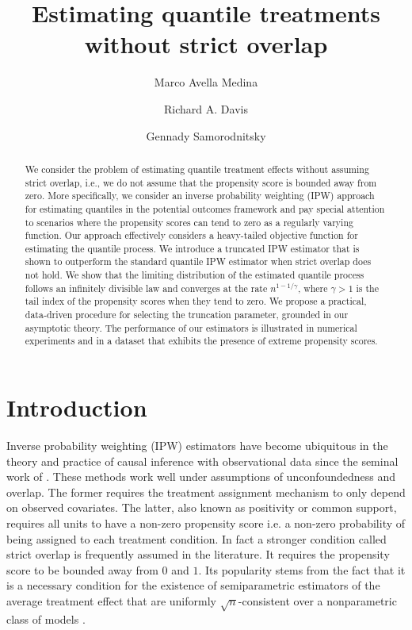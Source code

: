 \documentclass[12pt]{amsart}
\title{Estimating quantile treatments  without strict overlap}
\author{Marco Avella Medina}
\author{Richard A. Davis}
\author{Gennady Samorodnitsky}
\newcommand{\1}{\mathbbm{1}}
\newcommand{\0}{\mathbf{0}}
\theoremstyle{plain}
\theoremstyle{definition}
\begin{document}
\maketitle

\begin{abstract}
We consider the problem of estimating quantile treatment effects without assuming strict overlap, i.e., we do not assume that the propensity score is bounded away from zero. More specifically, we consider an inverse probability weighting (IPW) approach for estimating quantiles in the potential outcomes framework and pay special attention to scenarios where the propensity scores can tend to zero as a regularly varying function. Our approach effectively considers a heavy-tailed objective function for estimating the quantile process. We introduce a truncated  IPW estimator that is shown to outperform the standard quantile IPW estimator when strict overlap does not hold. We show that the limiting distribution of the estimated quantile process follows an infinitely divisible law  and converges at the  rate $n^{1-1/\gamma}$, where $\gamma>1$ is the tail index of the propensity scores when they tend to zero.  We propose a practical, data‑driven procedure for selecting the truncation parameter, grounded in our asymptotic theory. The performance of our estimators is illustrated in numerical experiments and in a dataset that exhibits the  presence of extreme propensity scores.


\end{abstract}

\section{Introduction}

Inverse probability weighting (IPW) estimators have become ubiquitous in the theory and practice of causal inference with observational data since the seminal work of \cite{rubin1974,rosenbaum:rubin1983,robins:rotnitzky:zhao1994}. These methods work well under assumptions of unconfoundedness and overlap. The former requires the treatment assignment mechanism to only depend on observed covariates. The latter, also known as positivity or common support,  requires all units to have a non-zero propensity score i.e. a non-zero probability of being assigned to each treatment condition. In fact a stronger condition called strict overlap is frequently assumed in the literature. It requires the propensity score to be bounded away from $0$ and $1$. Its popularity stems from the fact that it is a  necessary condition for the existence of  semiparametric estimators of the average treatment effect that are uniformly $\sqrt{n}$-consistent over a nonparametric class of models \cite{khan:tamer2010}. 
\end{document}
